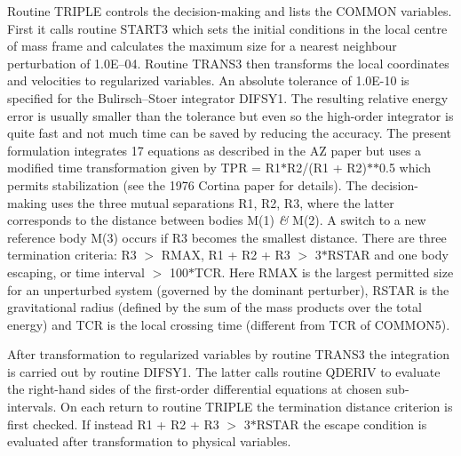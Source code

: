  Routine TRIPLE controls the decision-making and lists the COMMON variables.  First                      
   it calls routine START3 which sets the
   initial conditions in the local centre of mass frame and calculates the maximum size for a nearest                   
   neighbour perturbation of 1.0E--04.  Routine TRANS3 then transforms the local coordinates and                         
   velocities to regularized variables.  An absolute tolerance of 1.0E-10 is specified for the                          
   Bulirsch--Stoer integrator DIFSY1.  The resulting relative energy error is usually smaller than the                   
   tolerance but even so the high-order integrator is quite fast and not much time can be saved by                      
   reducing the accuracy.  The present formulation integrates 17 equations as described in the AZ paper                 
   but uses a modified time transformation given by TPR = R1$\ast$R2/(R1 + R2)$\ast$$\ast$0.5 which permits                            
   stabilization (see the 1976 Cortina paper for details).  The decision-making uses the three mutual                   
   separations R1, R2, R3, where the latter corresponds to the distance between bodies M(1) {\it\&} M(2).  A                  
   switch to a new reference body M(3) occurs if R3 becomes the smallest distance.  There are three                     
   termination criteria:  R3 $>$ RMAX, R1 + R2 + R3 $>$ 3$\ast$RSTAR and one body escaping, or time interval $>$                   
   100$\ast$TCR.  Here RMAX is the largest permitted size for an unperturbed system (governed by the dominant                
   perturber), RSTAR is the gravitational radius (defined by the sum of the mass products over the total                
   energy) and TCR is the local crossing time (different from                                                                          
   TCR of COMMON5).

 After transformation to regularized variables by routine TRANS3 the integration is carried out by                 
   routine DIFSY1.  The latter calls routine QDERIV to evaluate the right-hand sides of the first-order                 
   differential equations at chosen sub-intervals.  On each return to routine TRIPLE the termination                    
   distance criterion is first checked.  If instead R1 + R2 + R3 $>$ 3$\ast$RSTAR the escape condition is                      
   evaluated after transformation to physical variables.                                                                

